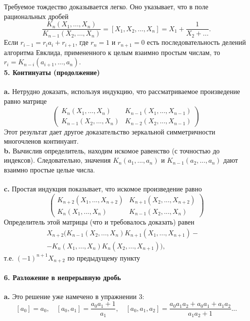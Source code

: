 \documentclass{mai_book}
\begin{document}
Требуемое тождество доказывается легко. Оно указывает, что в\linebreak
по­ле рациональных дробей
$$ \frac{K_n(X_1,...,X_n)}{K_{n-1}(X_2,...,X_n)}=[X_1,X_2,...,X_n]=X_1+\frac{1}{X_2+...}.$$
Если $r_{i-1}=r_ia_i+r_{i+1}$, где $r_n=1$ и $r_{n+1}=0$ есть последовательность\linebreak
делений алгоритма Евклида, примененного к целым взаимно простым\linebreak
числам, то $r_i=K_{n-i}(a_{i+1},...,a_n)$.\newline
\\
\noindent\textbf{5. Континуаты (продолжение)}\\
\\
\hspace*{15pt}\textbf{a.} Нетрудно доказать, используя индукцию, что рассматриваемое\linebreak
произведение равно матрице
$$\begin{pmatrix}
	K_n(X_1,...,X_n)& K_{n-	1}(X_1,...,X_{n-1})\\
	K_{n-1}(X_2,...,X_n)& K_{n-2}(X_2,...,X_{n-1})
\end{pmatrix}$$
\noindent Этот результат дает другое доказательство зеркальной симметричности\linebreak
многочленов континуант.\newline
\\
\hspace*{15pt}\textbf{b.} Вычислив определитель, находим искомое равенство (с точно­стью\linebreak
до индексов). Следовательно, значения $K_n(a_1,...,a_n)$ и\linebreak
$K_{n-1}(a_2,...,a_n)$ дают взаимно простые целые числа.\\
\\
\hspace*{15pt}\textbf{c.} Простая индукция показывает, что искомое произведение равно
$$\begin{pmatrix}
	K_{n+2}(X_1,...,X_{n+2})& K_{n+1}(X_2,...,X_{n+2})\\
	K_n(X_1,...,X_n)& K_{n-1}(X_2,...,X_n)
\end{pmatrix}$$
\noindent Определитель этой матрицы (что и требовалось доказать) равен
\begin{eqnarray*}
	X_{n+2}\Big( K_{n-1}(X_2,...,X_n) K_{n+1}(X_1,...,X_{n+1})-\quad\\
	-K_n(X_1,...,X_n)K_n(X_2,...,X_{n+1}) \Big),
\end{eqnarray*}
т.е.\:\: $(-1)^{n+1}X_{n+2}$\:\: по предыдущему пункту\\
\\
\noindent\textbf{6. Разложение в непрерывную дробь}\\
\\
\hspace*{15pt}\textbf{a.} Это решение уже намечено в упражнении 3:
$$[a_0]=a_0,\quad [a_0,a_1]=\frac{a_0a_1+1}{a_1},\quad [a_0,a_1,a_2]=\frac{a_0a_1a_2+a_0a_1+a_1a_2}{a_1a_2+1}...$$
\pagebreak
\end{document}
